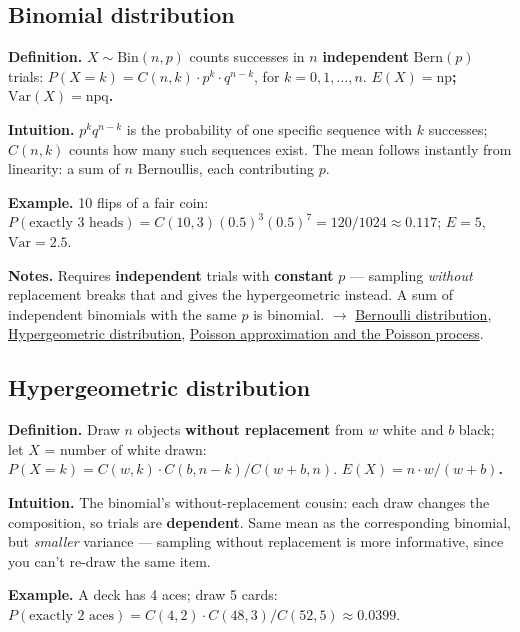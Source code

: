 \documentclass[11pt,a4paper]{article}
\begin{document}
\subsection{Binomial distribution}\label{sec:binomial-distribution}

\textbf{Definition.} $X \sim \mathrm{Bin}(n, p)$ counts successes in $n$ \textbf{independent} $\mathrm{Bern}(p)$ trials:
$P(X = k) = C(n, k)\cdot p^{k}\cdot q^{n-k}$, for $k = 0, 1, \ldots , n$. \textbf{$E(X) = \text{np}$; $\mathrm{Var}(X) = \text{npq}$.}

\textbf{Intuition.} $p^{k}q^{n-k}$ is the probability of one specific sequence with $k$ successes; $C(n,k)$ counts how many such sequences exist. The mean follows instantly from linearity: a sum of $n$ Bernoullis, each contributing $p$.

\textbf{Example.} 10 flips of a fair coin: $P(\text{exactly 3 heads}) = C(10,3)(0.5)^{3}(0.5)^{7} = 120/1024 \approx  0.117$; $E = 5$, $\mathrm{Var} = 2.5$.

\textbf{Notes.} Requires \textbf{independent} trials with \textbf{constant} $p$ --- sampling \textit{without} replacement breaks that and gives the hypergeometric instead. A sum of independent binomials with the same $p$ is binomial. $\to$ \hyperref[sec:bernoulli-distribution]{Bernoulli distribution}, \hyperref[sec:hypergeometric-distribution]{Hypergeometric distribution}, \hyperref[sec:poisson-approximation-and-the-poisson-process]{Poisson approximation and the Poisson process}.

\subsection{Hypergeometric distribution}\label{sec:hypergeometric-distribution}

\textbf{Definition.} Draw $n$ objects \textbf{without replacement} from $w$ white and $b$ black; let $X$ = number of white drawn:
$P(X = k) = C(w, k)\cdot C(b, n-k) / C(w + b, n)$. \textbf{$E(X) = n\cdot w/(w+b)$.}

\textbf{Intuition.} The binomial's without-replacement cousin: each draw changes the composition, so trials are \textbf{dependent}. Same mean as the corresponding binomial, but \textit{smaller} variance --- sampling without replacement is more informative, since you can't re-draw the same item.

\textbf{Example.} A deck has 4 aces; draw 5 cards: $P(\text{exactly 2 aces}) = C(4,2)\cdot C(48,3)/C(52,5) \approx  0.0399$.
\end{document}
